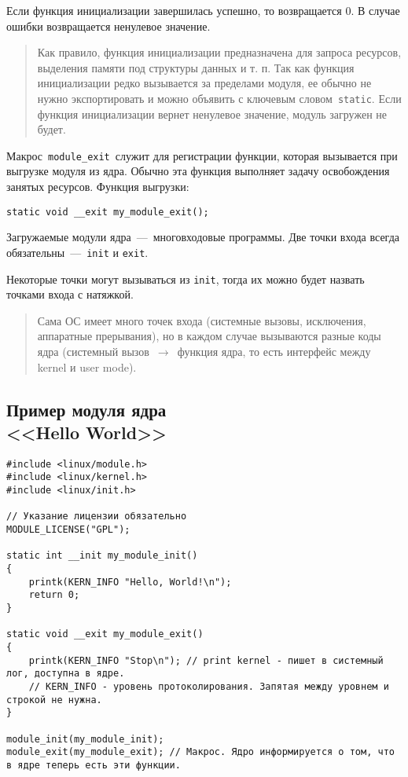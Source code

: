 Если функция инициализации завершилась успешно, то возвращается 0. В случае ошибки возвращается ненулевое значение.

\begin{quote}
	Как правило, функция инициализации предназначена для запроса ресурсов, выделения памяти под структуры данных и т. п. Так как функция инициализации редко вызывается за пределами модуля, ее обычно не нужно экспортировать и можно объявить с ключевым словом \texttt{static}. Если функция инициализации вернет ненулевое значение, модуль загружен не будет.
\end{quote}

Макрос \texttt{module\_exit} служит для регистрации функции, которая вызывается при выгрузке модуля из ядра. Обычно эта функция выполняет задачу освобождения занятых ресурсов. Функция выгрузки:

\begin{lstlisting}
static void __exit my_module_exit();
\end{lstlisting}

Загружаемые модули ядра~---~многовходовые программы. Две точки входа всегда обязательны~---~\texttt{init} и \texttt{exit}.

Некоторые точки могут вызываться из \texttt{init}, тогда их можно будет назвать точками входа с натяжкой.

\begin{quote}
	Сама ОС имеет много точек входа (системные вызовы, исключения, аппаратные прерывания), но в каждом случае вызываются разные коды ядра (системный вызов~$\rightarrow$~функция ядра, то есть интерфейс между kernel и user mode).
\end{quote}

\subsection{Пример модуля ядра \\ <<Hello World>>}

\begin{lstlisting}
#include <linux/module.h>
#include <linux/kernel.h>
#include <linux/init.h>

// Указание лицензии обязательно
MODULE_LICENSE("GPL");

static int __init my_module_init()
{
    printk(KERN_INFO "Hello, World!\n");
    return 0;
}

static void __exit my_module_exit()
{
    printk(KERN_INFO "Stop\n"); // print kernel - пишет в системный лог, доступна в ядре.
    // KERN_INFO - уровень протоколирования. Запятая между уровнем и строкой не нужна.
}

module_init(my_module_init);
module_exit(my_module_exit); // Макрос. Ядро информируется о том, что в ядре теперь есть эти функции.
\end{lstlisting}


